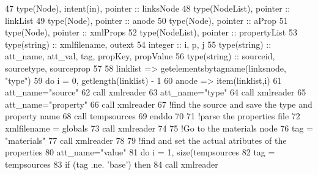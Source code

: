 \begin{DoxyCode}
47     \textcolor{keywordtype}{type}(Node), \textcolor{keywordtype}{intent(in)}, \textcolor{keywordtype}{pointer} :: linksNode
48     \textcolor{keywordtype}{type}(NodeList), \textcolor{keywordtype}{pointer} :: linkList
49     \textcolor{keywordtype}{type}(Node), \textcolor{keywordtype}{pointer} :: anode
50     \textcolor{keywordtype}{type}(Node), \textcolor{keywordtype}{pointer} :: aProp
51     \textcolor{keywordtype}{type}(Node), \textcolor{keywordtype}{pointer} :: xmlProps
52     \textcolor{keywordtype}{type}(NodeList), \textcolor{keywordtype}{pointer} :: propertyList
53     \textcolor{keywordtype}{type}(string) :: xmlfilename, outext
54     \textcolor{keywordtype}{integer} :: i, p, j
55     \textcolor{keywordtype}{type}(string) :: att\_name, att\_val, tag, propKey, propValue
56     \textcolor{keywordtype}{type}(string) :: sourceid, sourcetype, sourceprop
57 
58     linklist => getelementsbytagname(linksnode, \textcolor{stringliteral}{"type"})
59     \textcolor{keywordflow}{do} i = 0, getlength(linklist) - 1
60         anode => item(linklist,i)
61         att\_name=\textcolor{stringliteral}{"source"}
62         \textcolor{keyword}{call }xmlreader%
63         att\_name=\textcolor{stringliteral}{"type"}
64         \textcolor{keyword}{call }xmlreader%
65         att\_name=\textcolor{stringliteral}{"property"}
66         \textcolor{keyword}{call }xmlreader%
67         \textcolor{comment}{!find the source and save the type and property name}
68         \textcolor{keyword}{call }tempsources%
69 \textcolor{keywordflow}{    enddo}
70 
71     \textcolor{comment}{!parse the properties file}
72     xmlfilename = globals%
73     \textcolor{keyword}{call }xmlreader%
74 
75     \textcolor{comment}{!Go to the materials node}
76     tag = \textcolor{stringliteral}{"materials"}
77     \textcolor{keyword}{call }xmlreader%
78 
79     \textcolor{comment}{!find and set the actual atributes of the properties}
80     att\_name=\textcolor{stringliteral}{"value"}
81     \textcolor{keywordflow}{do} i = 1, \textcolor{keyword}{size}(tempsources%
82         tag = tempsources%
83         \textcolor{keywordflow}{if} (tag .ne. \textcolor{stringliteral}{'base'}) \textcolor{keywordflow}{then}
84             \textcolor{keyword}{call }xmlreader%

\end{DoxyCode}
